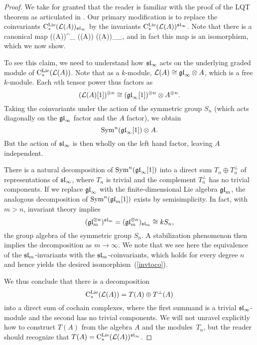 \documentclass[11pt]{amsart}
\numberwithin{equation}{section}
\begin{document}
\begin{proof}
We take for granted that the reader is familiar with the proof of the LQT theorem as articulated in \cite{LQ, Weibel, Loday}.
Our primary modification is to replace the coinvariants $\cliels(\cL(A))_{\sl_\infty}$ by the invariants $\cliels(\cL(A))^{\sl_\infty}$.
Note that there is a canonical map
\beqn\label{invtoco}
\cliels(\cL(A))^{\sl_\infty} \hookrightarrow \cliels(\cL(A)) \to \cliels(\cL(A))_{\sl_\infty},
\eeqn
and in fact this map is an isomorphism, which we now show.

To see this claim, we need to understand how $\sl_\infty$ acts on the underlying graded module of $\cliels(\cL(A))$. Note that as a $k$-module, $\cL(A) \cong \gl_\infty \otimes A$, which is a free $k$-module. 
Each $n$th tensor power thus factors as
\[
(\cL(A)[1])^{\otimes n} \cong (\gl_\infty[1])^{\otimes n} \otimes A^{\otimes n}.
\]
Taking the coinvariants under the action of the symmetric group $S_n$
(which acts diagonally on the $\gl_\infty$ factor and the $A$ factor),
we obtain
\[
\Sym^n (\gl_\infty[1]) \otimes A.
\]
But the action of $\sl_\infty$ is then wholly on the left hand factor, leaving $A$ independent.

There is a natural decomposition of $\Sym^n (\gl_\infty[1])$ into a direct sum $T_n \oplus T_n^\perp$ of representations of $\sl_\infty$, where $T_n$ is trivial and the complement $T_n^\perp$ has no trivial components.
If we replace $\gl_\infty$ with the finite-dimensional Lie algebra $\gl_m$, 
the analogous decomposition of $\Sym^n (\gl_m[1])$ exists by semisimplicity. 
In fact, with $m > n$, invariant theory implies
\[
(\gl_m^{\otimes n})^{\sl_m} = (\gl_m^{\otimes n})_{\sl_m} \cong k S_n,
\]  
the group algebra of the symmetric group $S_n$.
A stabilization phenomenon then implies the decomposition as $m \to \infty$.
We note that we see here the equivalence of the $\sl_m$-invariants with the $\sl_m$-coinvariants,
which holds for every degree $n$ and hence yields the desired isomorphism~(\ref{invtoco}).

We thus conclude that there is a decomposition
\[
\cliels(\cL(A)) = T(A) \oplus T^\perp(A)
\]
into a direct sum of cochain complexes,
where the first summand is a trivial $\sl_\infty$-module and the second has no trivial components.
We will not unravel explicitly how to construct $T(A)$ from the algebra $A$ and the modules~$T_n$,
but the reader should recognize that $T(A) = \cliels(\cL(A))^{\sl_\infty}$.


\end{proof}
\end{document}
